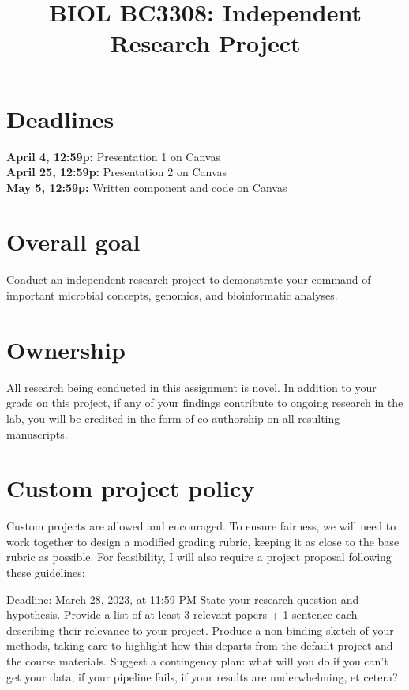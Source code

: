 \documentclass{article}
\title{BIOL BC3308: Independent Research Project}
\begin{document}
\maketitle{}

\section*{Deadlines}
\textbf{April 4, 12:59p: }Presentation 1 on Canvas\\
\textbf{April 25, 12:59p:} Presentation 2 on Canvas\\
\textbf{May 5, 12:59p:} Written component and code on Canvas

\section*{Overall goal} Conduct an independent research project to demonstrate your command of important microbial concepts, genomics, and bioinformatic analyses.

\section*{Ownership} All research being conducted in this assignment is novel. In addition to your grade on this project, if any of your findings contribute to ongoing research in the lab, you will be credited in the form of co-authorship on all resulting manuscripts.

\section*{Custom project policy} Custom projects are allowed and encouraged. To ensure fairness, we will need to work together to design a modified grading rubric, keeping it as close to the base rubric as possible. For feasibility, I will also require a project proposal following these guidelines:
\begin{outline}
    \1 Deadline: March 28, 2023, at 11:59 PM
    \1 State your research question and hypothesis.
    \1 Provide a list of at least 3 relevant papers + 1 sentence each describing their relevance to your project.
    \1 Produce a non-binding sketch of your methods, taking care to highlight how this departs from the default project and the course materials.
    \1 Suggest a contingency plan: what will you do if you can't get your data, if your pipeline fails, if your results are underwhelming, et cetera?
\end{outline}
\end{document}
